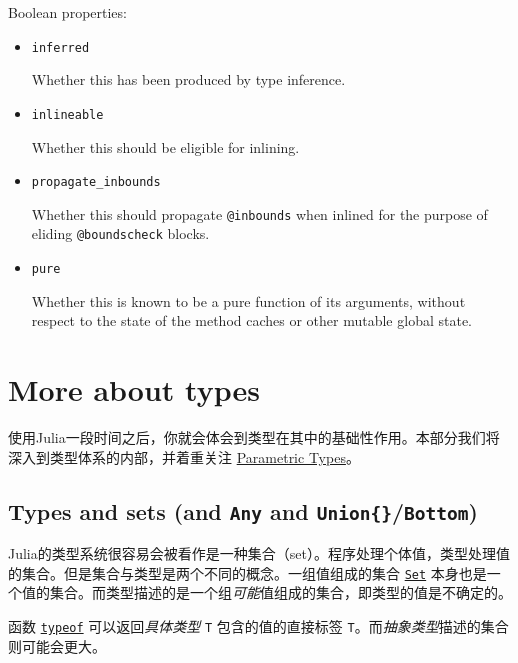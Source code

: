 Boolean properties:



\begin{itemize}
\item \texttt{inferred}

Whether this has been produced by type inference.


\item \texttt{inlineable}

Whether this should be eligible for inlining.


\item \texttt{propagate\_inbounds}

Whether this should propagate \texttt{@inbounds} when inlined for the purpose of eliding \texttt{@boundscheck} blocks.


\item \texttt{pure}

Whether this is known to be a pure function of its arguments, without respect to the state of the method caches or other mutable global state.

\end{itemize}


\hypertarget{4038509094133832716}{}


\section{More about types}



使用Julia一段时间之后，你就会体会到类型在其中的基础性作用。本部分我们将深入到类型体系的内部，并着重关注 \hyperlink{5611641345231583503}{Parametric Types}。



\hypertarget{8213772846516553388}{}


\subsection{Types and sets (and \texttt{Any} and \texttt{Union\{\}}/\texttt{Bottom})}



Julia的类型系统很容易会被看作是一种集合（set）。程序处理个体值，类型处理值的集合。但是集合与类型是两个不同的概念。一组值组成的集合 \hyperlink{1143189053501747033}{\texttt{Set}} 本身也是一个值的集合。而类型描述的是一个组\emph{可能}值组成的集合，即类型的值是不确定的。



函数 \hyperlink{13440452181855594120}{\texttt{typeof}} 可以返回\emph{具体类型} \texttt{T} 包含的值的直接标签 \texttt{T}。而\emph{抽象类型}描述的集合则可能会更大。



